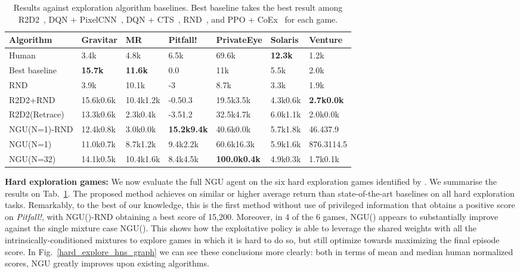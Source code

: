 \documentclass{article} \usepackage{iclr2020_conference,times}
\begin{document}
\begin{table}
\small
\centering
\begin{tabular}{m{2.3cm}|m{1.4cm}m{1.4cm}m{1.4cm}m{1.6cm}m{1.3cm}m{1.2cm}}
Algorithm & Gravitar & MR & Pitfall! & PrivateEye & Solaris & Venture\\ \hline
Human & 3.4k & 4.8k & 6.5k & 69.6k & \textbf{12.3k} & 1.2k \\ \hline
Best baseline & \textbf{15.7k} & \textbf{11.6k} & 0.0 & 11k & 5.5k & 2.0k \\
RND & 3.9k & 10.1k & -3 & 8.7k & 3.3k & 1.9k \\
R2D2+RND & 15.6k0.6k & 10.4k1.2k & -0.50.3 & 19.5k3.5k & 4.3k0.6k & \textbf{2.7k0.0k}\\
R2D2(Retrace) & 13.3k0.6k & 2.3k0.4k & -3.51.2 & 32.5k4.7k & 6.0k1.1k & 2.0k0.0k\\
NGU(N=1)-RND & 12.4k0.8k & 3.0k0.0k & \textbf{15.2k9.4k} & 40.6k0.0k & 5.7k1.8k & 46.437.9\\
NGU(N=1) & 11.0k0.7k & 8.7k1.2k & 9.4k2.2k & 60.6k16.3k & 5.9k1.6k & 876.3114.5\\
NGU(N=32) & 14.1k0.5k & 10.4k1.6k & 8.4k4.5k & \textbf{100.0k0.4k} & 4.9k0.3k & 1.7k0.1k
\end{tabular}
\vspace{-2ex}
\caption{Results against exploration algorithm baselines. Best baseline takes the best result among R2D2~\citep{r2d2}, DQN + PixelCNN~\citep{ostrovski2017count}, DQN + CTS~\citep{bellemare2016unifying}, RND~\citep{burda2018exploration}, and PPO + CoEx~\citep{choi2018contingency} for each game.}
\label{table_action_prediction_montezuma}
\vspace{-2ex}
\end{table}

{\bf Hard exploration games: } 
We now evaluate the full NGU agent on the six hard exploration games identified by \citet{bellemare2016unifying}.
We summarise the results on Tab.~\ref{table_action_prediction_montezuma}. The proposed method achieves on similar or higher average return than state-of-the-art baselines on all hard exploration tasks.
Remarkably, to the best of our knowledge, this is the first method without use of privileged information that obtains a positive score on \textit{Pitfall!}, with NGU()-RND obtaining a best score of 15,200. Moreover, in 4 of the 6 games, NGU() appears to substantially improve against the single mixture case NGU(). This shows how the exploitative policy is able to leverage the shared weights with all the intrinsically-conditioned mixtures to explore games in which it is hard to do so, but still optimize towards maximizing the final episode score.
In Fig.~\ref{hard_explore_hns_graph} we can see these conclusions more clearly: both in terms of mean and median human normalized scores, NGU greatly improves upon existing algorithms.
\end{document}
